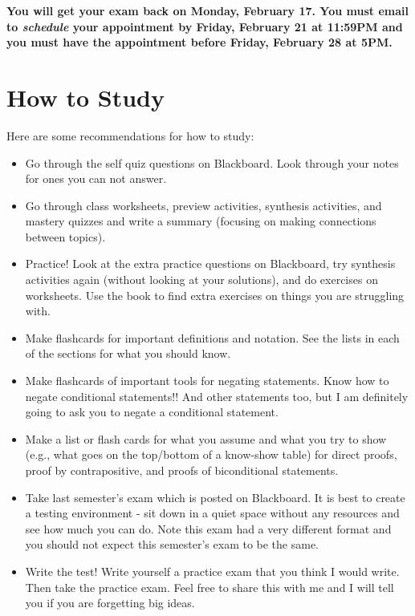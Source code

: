 \documentclass[12pt]{amsart}
\theoremstyle{definition}
\begin{document}
\noindent\textbf{You will get your exam back on Monday, February 17. You must email to \emph{schedule} your appointment by Friday, February 21 at 11:59PM and you must have the appointment before Friday, February 28 at 5PM.}

\vfill

\section{How to Study}

Here are some recommendations for how to study:
\begin{itemize}
\item Go through the self quiz questions on Blackboard. Look through your notes for ones you can not answer.
\item Go through class worksheets, preview activities, synthesis activities, and mastery quizzes and write a summary (focusing on making connections between topics).  
\item Practice!  Look at the extra practice questions on Blackboard, try synthesis activities again (without looking at your solutions), and do exercises on worksheets.  Use the book to find extra exercises on things you are struggling with.
\item Make flashcards for important definitions and notation. See the lists in each of the sections for what you should know.
\item Make flashcards of important tools for negating statements. Know how to negate conditional statements!! And other statements too, but I am definitely going to ask you to negate a conditional statement.
\item Make a list or flash cards for what you assume and what you try to show (e.g., what goes on the top/bottom of a know-show table) for direct proofs, proof by contrapositive, and proofs of biconditional statements. 
\item Take last semester's exam which is posted on Blackboard. It is best to create a testing environment - sit down in a quiet space without any resources and see how much you can do. Note this exam had a very different format and you should not expect this semester's exam to be the same.
\item Write the test! Write yourself a practice exam that you think I would write.  Then take the practice exam.  Feel free to share this with me and I will tell you if you are forgetting big ideas.
\end{itemize}
\end{document}
